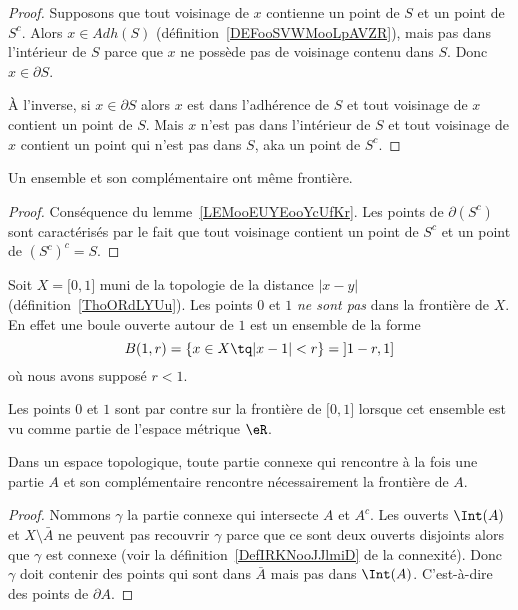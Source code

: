 \begin{proof}
	Supposons que tout voisinage de \( x\) contienne un point de \( S\) et un point de \( S^c\). Alors \( x\in Adh(S)\) (définition~\ref{DEFooSVWMooLpAVZR}), mais pas dans l'intérieur de \( S\) parce que \( x\) ne possède pas de voisinage contenu dans \( S\). Donc \( x\in \partial S\).

	À l'inverse, si \( x\in\partial S\) alors \( x\) est dans l'adhérence de \( S\) et tout voisinage de \( x\) contient un point de \( S\). Mais \( x\) n'est pas dans l'intérieur de \( S\) et tout voisinage de \( x\) contient un point qui n'est pas dans \( S\), aka un point de \( S^c\).
\end{proof}

\begin{corollary}
	Un ensemble et son complémentaire ont même frontière.
\end{corollary}

\begin{proof}
	Conséquence du lemme~\ref{LEMooEUYEooYcUfKr}. Les points de \( \partial(S^c)\) sont caractérisés par le fait que tout voisinage contient un point de \( S^c\) et un point de \( (S^c)^c=S\).
\end{proof}

\begin{example}
	Soit \( X=\mathopen[ 0 , 1 \mathclose]\) muni de la topologie de la distance \( | x-y |\) (définition~\ref{ThoORdLYUu}). Les points \( 0\) et \( 1\) \emph{ne sont pas} dans la frontière de \( X\). En effet une boule ouverte autour de \( 1\) est un ensemble de la forme
	\begin{equation}
		B(1,r)=\{ x\in X\tq | x-1 |<r \}=\mathopen] 1-r , 1 \mathclose]
	\end{equation}
	où nous avons supposé \( r<1\).

	Les points \( 0\) et \( 1\) sont par contre sur la frontière de \( \mathopen[ 0 , 1 \mathclose]\) lorsque cet ensemble est vu comme partie de l'espace métrique \( \eR\).
\end{example}

\begin{lemma}        \label{LEMooLKWEooItGnkP}
	Dans un espace topologique, toute partie connexe qui rencontre à la fois une partie \( A\) et son complémentaire rencontre nécessairement la frontière de \( A\).
\end{lemma}

\begin{proof}
	Nommons \( \gamma\) la partie connexe qui intersecte \( A\) et \( A^c\). Les ouverts \( \Int(A)\) et \( X\setminus \bar A\) ne peuvent pas recouvrir \( \gamma\) parce que ce sont deux ouverts disjoints alors que \( \gamma\) est connexe (voir la définition~\ref{DefIRKNooJJlmiD} de la connexité). Donc \( \gamma\) doit contenir des points qui sont dans \( \bar A\) mais pas dans \( \Int(A)\). C'est-à-dire des points de \( \partial A\).
\end{proof}


